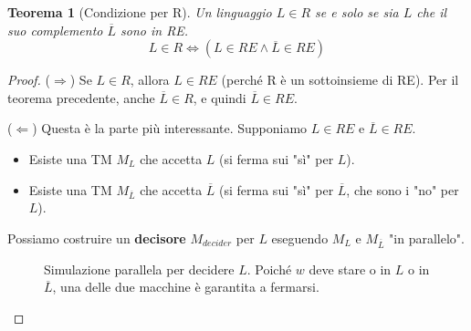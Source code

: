 \documentclass[a4paper]{article}
\newtheorem{theorem}{Teorema}
\theoremstyle{remark} %
\begin{document}
\begin{theorem}[Condizione per R]
Un linguaggio $L \in R$ se e solo se sia $L$ che il suo complemento $\overline{L}$ sono in RE.
\[ L \in R \iff (L \in RE \land \overline{L} \in RE) \]
\end{theorem}
\begin{proof}
($\Rightarrow$) Se $L \in R$, allora $L \in RE$ (perché R è un sottoinsieme di RE). Per il teorema precedente, anche $\overline{L} \in R$, e quindi $\overline{L} \in RE$.

($\Leftarrow$) Questa è la parte più interessante. Supponiamo $L \in RE$ e $\overline{L} \in RE$.
\begin{itemize}
    \item Esiste una TM $M_L$ che accetta $L$ (si ferma sui "sì" per $L$).
    \item Esiste una TM $M_{\overline{L}}$ che accetta $\overline{L}$ (si ferma sui "sì" per $\overline{L}$, che sono i "no" per $L$).
\end{itemize}
Possiamo costruire un \textbf{decisore} $M_{decider}$ per $L$ eseguendo $M_L$ e $M_{\overline{L}}$ "in parallelo".

\begin{figure}[h!]
\centering
{}
\caption{Simulazione parallela per decidere $L$. Poiché $w$ deve stare o in $L$ o in $\overline{L}$, una delle due macchine è garantita a fermarsi.}
\label{fig:parallel}
\end{figure}


\end{proof}
\end{document}

